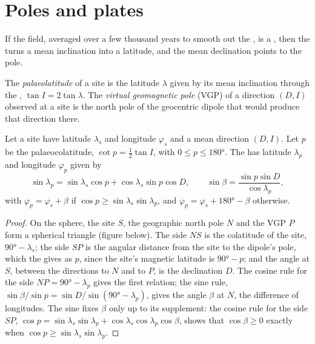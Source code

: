 \section{Poles and plates}

If the field, averaged over a few thousand years to smooth out the , is a , then the  turns a mean
inclination into a latitude, and the mean declination points to the pole.

\begin{definition}\label{def:b3:palaeomagnetism:vgp}
The \emph{palaeolatitude} of a site is the latitude
$\lambda$ given by its mean inclination through the , $\tan I =
2\tan\lambda$. The \emph{virtual geomagnetic pole}
(VGP) of a direction $(D, I)$ observed at a site is the north pole of the
geocentric dipole that would produce that direction there.
\end{definition}

\begin{theorem}\label{thm:b3:palaeomagnetism:pole}
Let a site have latitude $\lambda_s$ and longitude $\varphi_s$ and a mean
direction $(D, I)$. Let $p$ be the palaeocolatitude, $\cot p = \tfrac12\tan I$,
with $0 \le p \le \ang{180}$. The  has latitude
$\lambda_p$ and longitude $\varphi_p$ given by
\[
  \sin\lambda_p = \sin\lambda_s\cos p + \cos\lambda_s\sin p\cos D,\qquad
  \sin\beta = \frac{\sin p\sin D}{\cos\lambda_p},
\]
with $\varphi_p = \varphi_s + \beta$ if $\cos p \ge \sin\lambda_s\sin\lambda_p$,
and $\varphi_p = \varphi_s + \ang{180} - \beta$ otherwise.
\end{theorem}

\begin{proof}
On the sphere, the site $S$, the geographic north pole $N$ and the VGP $P$ form a
spherical triangle (figure below). The side $NS$ is the colatitude of the site,
$\ang{90} - \lambda_s$; the side $SP$ is the angular distance from the site to
the dipole's pole, which the  gives as $p$, since the site's
magnetic latitude is $\ang{90} - p$; and the angle at $S$, between the
directions to $N$ and to $P$, is the declination $D$. The cosine rule for the
side $NP = \ang{90} - \lambda_p$ gives the first relation; the sine rule,
$\sin\beta/\sin p = \sin D/\sin(\ang{90} - \lambda_p)$, gives the angle $\beta$
at $N$, the difference of longitudes. The sine fixes $\beta$ only up to its
supplement: the cosine rule for the side $SP$, $\cos p = \sin\lambda_s
\sin\lambda_p + \cos\lambda_s\cos\lambda_p\cos\beta$, shows that $\cos\beta \ge
0$ exactly when $\cos p \ge \sin\lambda_s\sin\lambda_p$.
\end{proof}

